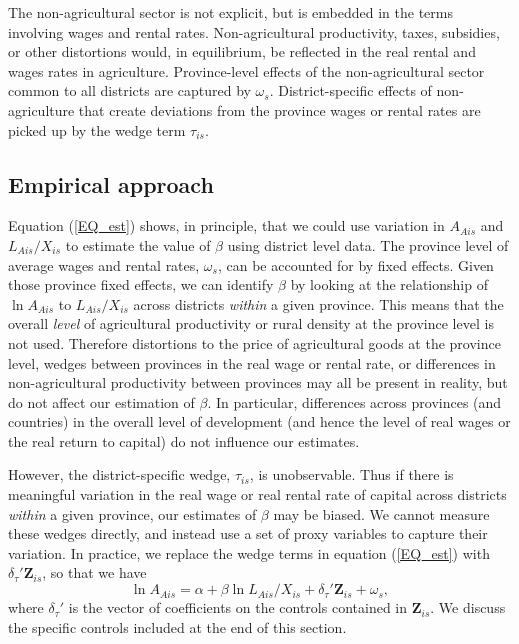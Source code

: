 \documentclass[11pt]{article}
\begin{document}
The non-agricultural sector is not explicit, but is embedded in the terms involving wages and rental rates. Non-agricultural productivity, taxes, subsidies, or other distortions would, in equilibrium, be reflected in the real rental and wages rates in agriculture. Province-level effects of the non-agricultural sector common to all districts are captured by $\omega_s$. District-specific effects of non-agriculture that create deviations from the province wages or rental rates are picked up by the wedge term $\tau_{is}$.

\subsection{Empirical approach}
Equation (\ref{EQ_est}) shows, in principle, that we could use variation in $A_{Ais}$ and $L_{Ais}/X_{is}$ to estimate the value of $\beta$ using district level data. The province level of average wages and rental rates, $\omega_s$, can be accounted for by fixed effects. Given those province fixed effects, we can identify $\beta$ by looking at the relationship of $\ln A_{Ais}$ to $L_{Ais}/X_{is}$ across districts \textit{within} a given province. This means that the overall \textit{level} of agricultural productivity or rural density at the province level is not used. Therefore distortions to the price of agricultural goods at the province level, wedges between provinces in the real wage or rental rate, or differences in non-agricultural productivity between provinces may all be present in reality, but do not affect our estimation of $\beta$. In particular, differences across provinces (and countries) in the overall level of development (and hence the level of real wages or the real return to capital) do not influence our estimates.

However, the district-specific wedge, $\tau_{is}$, is unobservable. Thus if there is meaningful variation in the real wage or real rental rate of capital across districts \textit{within} a given province, our estimates of $\beta$ may be biased. We cannot measure these wedges directly, and instead use a set of proxy variables to capture their variation. In practice, we replace the wedge terms in equation (\ref{EQ_est}) with $\delta_{\tau}' \mathbf{Z}_{is}$, so that we have
\begin{equation}
	\ln A_{Ais} = \alpha + \beta \ln L_{Ais}/X_{is} + \delta_{\tau}' \mathbf{Z}_{is} + \omega_s, \label{EQ_Omega}
\end{equation}
where $\delta_{\tau}'$ is the vector of coefficients on the controls contained in $\mathbf{Z}_{is}$. We discuss the specific controls included at the end of this section.
\end{document}
